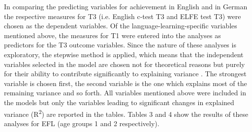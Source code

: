 \documentclass[output=paper]{langsci/langscibook}
\begin{document}
In comparing the predicting variables for achievement in English and in German the respective measures for T3 (i.e. English c-test T3 and ELFE test T3) were chosen as the dependent variables. Of the language-learning-specific variables mentioned above, the measures for T1 were entered into the analyses as predictors for the T3 outcome variables. Since the nature of these analyses is exploratory, the stepwise method is applied, which means that the independent variables selected in the model are chosen not for theoretical reasons but purely for their ability to contribute significantly to explaining variance \citep[213]{Field2009}. The strongest variable is chosen first, the second variable is the one which explains most of the remaining variance and so forth. All variables mentioned above were included in the models but only the variables leading to significant changes in explained variance (R\textsuperscript{2})\textsuperscript{} are reported in the tables. Tables 3 and 4 show the results of these analyses for EFL (age groups 1 and 2 respectively).

\begin{table}
\caption{Grade 5 – results of the stepwise multiple regression analysis for achievement in English (c-test T3) with predictors T1, ***: $p<0.001$, **: $p<0.01$, *: $p<0.05$; $n=170$. SCE: Self-concept English, IA: Inductive ability, FI: Fluid intelligence, BDS: Backward digit span, PCA: Phonemic coding ability}
\end{table}
\end{document}
